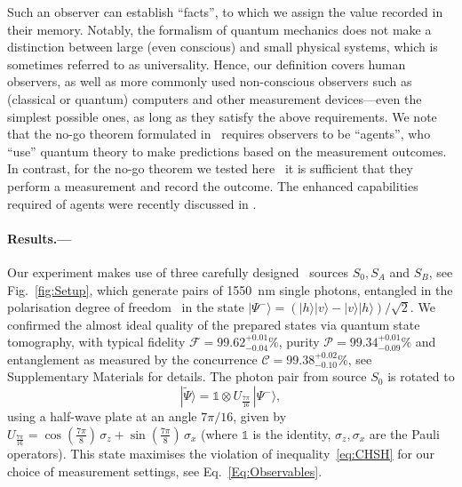 \documentclass[aps,floatfix,superscriptaddress,twocolumn,tightenlines,amsmath,amssymb,nofootinbib,10pt]{revtex4-1}
\newcommand{\ket}[1] {| #1 \rangle}
\newcommand{\id}{\mathds{1}}
\begin{document}
Such an observer can establish ``facts'', to which we assign the value recorded in their memory. Notably, the formalism of quantum mechanics does not make a distinction between large (even conscious) and small physical systems, which is sometimes referred to as universality. Hence, our definition covers human observers, as well as more commonly used non-conscious observers such as (classical or quantum) computers and other measurement devices---even the simplest possible ones, as long as they satisfy the above requirements. We note that the no-go theorem formulated in~\cite{Frauchiger2016} requires observers to be ``agents'', who ``use'' quantum theory to make predictions based on the measurement outcomes. In contrast, for the no-go theorem we tested here~\cite{Brukner2018} it is sufficient that they perform a measurement and record the outcome. The enhanced capabilities required of agents were recently discussed in \cite{Baumann2019}.


\paragraph*{Results.---}
Our experiment makes use of three carefully designed~\cite{GraffittiOptica, GraffittiPRA} sources $S_0, S_A$ and $S_B$, see Fig.~\ref{fig:Setup}, which generate pairs of 1550~nm single photons, entangled in the polarisation degree of freedom~\cite{Jin14} in the state $\ket{\Psi^{-}}=\left(\ket{h}\ket{v}-\ket{v}\ket{h}\right)/\sqrt{2}$. We confirmed the almost ideal quality of the prepared states via quantum state tomography, with typical fidelity $\mathcal{F}=99.62^{+0.01}_{-0.04}\%$, purity $\mathcal{P}=99.34^{+0.01}_{-0.09}\%$
and entanglement as measured by the concurrence $\mathcal{C}=99.38^{+0.02}_{-0.10}\%$, see Supplementary Materials for details. The photon pair from source $S_0$ is rotated to
\begin{equation}
\ket{\widetilde\Psi}= \id \otimes U_{\frac{7\pi}{16}} \, \ket{\Psi^{-}},
\label{Eq:ResourceState}
\end{equation}
using a half-wave plate at an angle $7\pi/16$, given by $U_{\frac{7\pi}{16}} = \cos (\frac{7\pi}{8}) \, \sigma_z + \sin (\frac{7\pi}{8}) \, \sigma_x$ (where $\id$ is the identity, $\sigma_z, \sigma_x$ are the Pauli operators).
This state maximises the violation of inequality~\eqref{eq:CHSH} for our choice of measurement settings, see Eq.~\eqref{Eq:Observables}.
\end{document}
